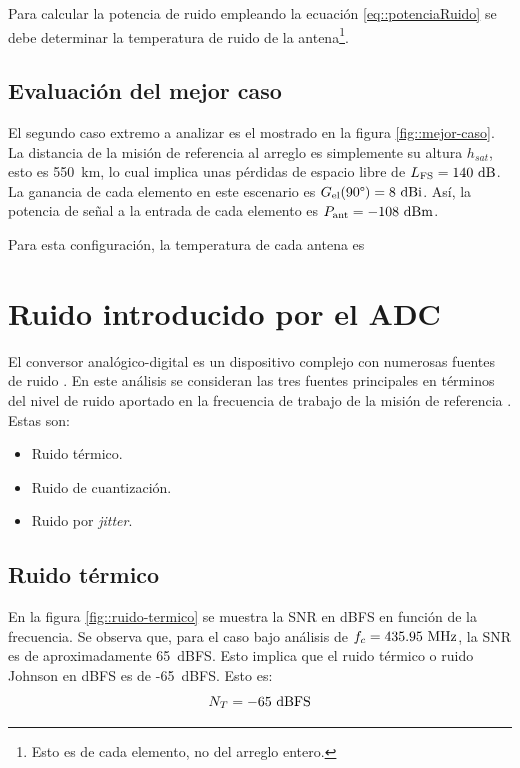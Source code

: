 \documentclass[../../main.tex]{subfiles}
\begin{document}
Para calcular la potencia de ruido empleando la ecuación \ref{eq::potenciaRuido} se debe determinar la temperatura de ruido de la antena\footnote{Esto es de cada elemento, no del arreglo entero.}.

\subsection{Evaluación del mejor caso}
El segundo caso extremo a analizar es el mostrado en la figura \ref{fig::mejor-caso}. La distancia de la misión de referencia al arreglo es simplemente su altura $h_{sat}$, esto es 550~km, lo cual implica unas pérdidas de espacio libre de $L_\textrm{FS} = 140~\textrm{dB}$. La ganancia de cada elemento en este escenario es $G_\textrm{el}(90\degree) = 8~\textrm{dBi}$. Así, la potencia de señal a la entrada de cada elemento es $P_\textrm{ant} = -108~\textrm{dBm}$.

Para esta configuración, la temperatura de cada antena es

\section{Ruido introducido por el ADC}
El conversor analógico-digital es un dispositivo complejo con numerosas fuentes de ruido \cite{ruidos-adc}. En este análisis se consideran las tres fuentes principales en términos del nivel de ruido aportado en la frecuencia de trabajo de la misión de referencia \cite{AD9249}. Estas son:
\begin{itemize}
    \item Ruido térmico.
    \item Ruido de cuantización.
    \item Ruido por \textit{jitter}.
\end{itemize}

\subsection{Ruido térmico}
En la figura \ref{fig::ruido-termico} se muestra la SNR en dBFS en función de la frecuencia. Se observa que, para el caso bajo análisis de $f_c = 435.95~\textrm{MHz}$, la SNR es de aproximadamente 65~dBFS. Esto implica que el ruido térmico o ruido Johnson en dBFS es de -65~dBFS. Esto es:
\begin{equation}
    N_T = -65~\textrm{dBFS}
    \label{eq::ruido-termico}
\end{equation}
\end{document}
